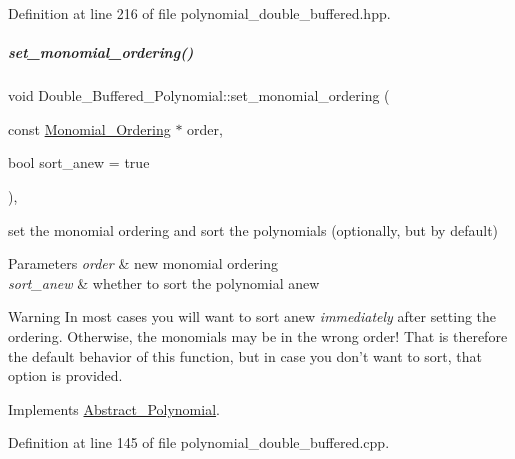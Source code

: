 Definition at line 216 of file polynomial\+\_\+double\+\_\+buffered.\+hpp.

\mbox{\label{group__polygroup_aa81be797dcced4e663d3fe54f6501ed6}} 
\subparagraph{\texorpdfstring{set\+\_\+monomial\+\_\+ordering()}{set\_monomial\_ordering()}}
{\footnotesize\ttfamily void Double\+\_\+\+Buffered\+\_\+\+Polynomial\+::set\+\_\+monomial\+\_\+ordering (\begin{DoxyParamCaption}\item[{const \hyperlink{group__orderinggroup_class_monomial___ordering}{Monomial\+\_\+\+Ordering} $\ast$}]{order,  }\item[{bool}]{sort\+\_\+anew = {\ttfamily true} }\end{DoxyParamCaption})\hspace{0.3cm}{\ttfamily [override]}, {\ttfamily [virtual]}}



set the monomial ordering and sort the polynomials (optionally, but by default) 


\begin{DoxyParams}{Parameters}
{\em order} & new monomial ordering \\
\hline
{\em sort\+\_\+anew} & whether to sort the polynomial anew \\
\hline
\end{DoxyParams}
\begin{DoxyWarning}{Warning}
In most cases you will want to sort anew {\itshape immediately} after setting the ordering. Otherwise, the monomials may be in the wrong order! That is therefore the default behavior of this function, but in case you don't want to sort, that option is provided. 
\end{DoxyWarning}


Implements \hyperlink{group__polygroup_a12e023570eb675343c4b7ed635a031dc}{Abstract\+\_\+\+Polynomial}.



Definition at line 145 of file polynomial\+\_\+double\+\_\+buffered.\+cpp.

